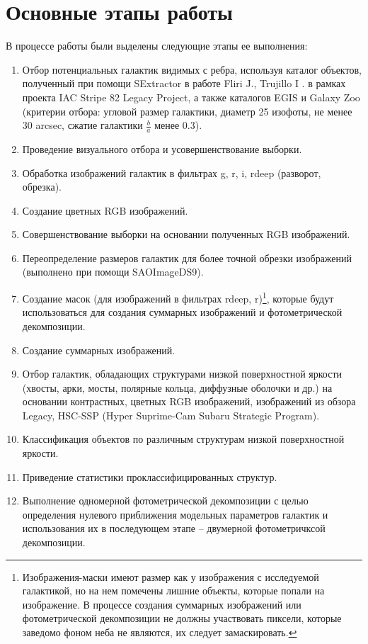 \section{Основные этапы работы}
В процессе работы были выделены следующие этапы ее выполнения:
\begin{enumerate}
    \item Отбор потенциальных галактик видимых с ребра, используя каталог объектов, полученный при помощи SExtractor  в работе Fliri J., Trujillo I \cite{2016MNRAS.456.1359F}. в рамках проекта IAC Stripe 82 Legacy Project, а также каталогов EGIS \cite{2017MNRAS.465.3784B} и Galaxy Zoo \cite{2017yCat..74613663H} (критерии отбора: угловой размер галактики, диаметр 25 изофоты,  не менее 30 arcsec, сжатие галактики $\frac{b}{a}$ менее 0.3).
    \item Проведение визуального отбора и усовершенствование выборки.
    \item Обработка изображений галактик в фильтрах g, r, i, rdeep (разворот, обрезка).
    \item Создание цветных RGB изображений.
    \item  Совершенствование выборки на основании полученных RGB изображений.
    \item Переопределение размеров галактик для более точной обрезки изображений (выполнено при помощи SAOImageDS9).
    \item Создание масок (для изображений в фильтрах rdeep, r)\footnote{Изображения-маски имеют размер как у изображения с исследуемой галактикой, но на нем помечены лишние объекты, которые попали на изображение. В процессе создания суммарных изображений или фотометрической декомпозиции не должны участвовать пиксели, которые заведомо
фоном неба не являются, их следует замаскировать.}, которые будут использоваться для создания суммарных изображений и фотометрической декомпозиции. 
    \item Создание суммарных изображений.
    \item Отбор галактик, обладающих структурами низкой поверхностной яркости (хвосты, арки, мосты, полярные кольца, диффузные оболочки и др.) на основании контрастных, цветных RGB изображений, изображений из обзора Legacy\cite{2019AJ....157..168D}, HSC-SSP (Hyper Suprime-Cam Subaru Strategic Program)\cite{2022PASJ...74..247A}.
    \item Классификация объектов по различным структурам низкой поверхностной яркости.
    \item Приведение статистики проклассифицированных структур.
    \item Выполнение одномерной фотометрической декомпозиции с целью определения нулевого приближения модельных параметров галактик и использования их в последующем этапе -- двумерной фотометричксой декомпозиции.

\end{enumerate}
